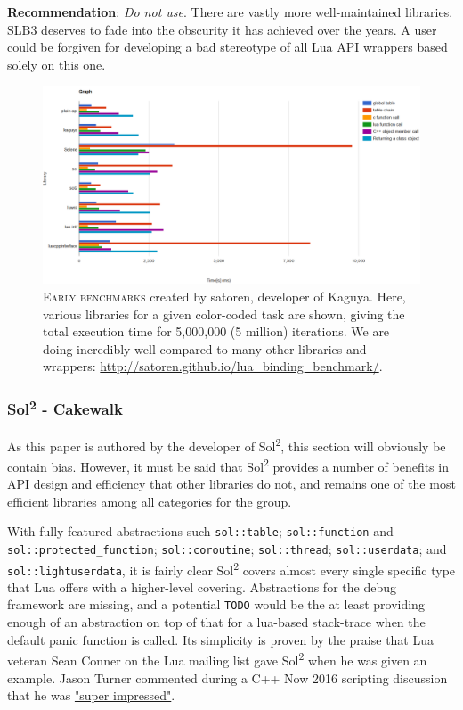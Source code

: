 \documentclass[conference,compsoc]{IEEEtran}
\newcommand{\soltwo}{Sol\textsuperscript{2}}
\begin{document}
\textbf{Recommendation}: \emph{Do not use}. There are vastly more well-maintained libraries. SLB3 deserves to fade into the obscurity it has achieved over the years. A user could be forgiven for developing a bad stereotype of all Lua API wrappers based solely on this one.

\begin{figure}[ht!]
	\includegraphics[width=\textwidth]{early-benchmark}
	\centering
	\caption{\textsc{Early benchmarks} created by satoren, developer of Kaguya. Here, various libraries for a given color-coded task are shown, giving the total execution time for 5,000,000 (5 million) iterations. We are doing incredibly well compared to many other libraries and wrappers: \url{http://satoren.github.io/lua_binding_benchmark/}.}
	\label{fig:early-benchmark}
\end{figure}

\subsubsection{\soltwo{} - Cakewalk}

As this paper is authored by the developer of \soltwo{}, this section will obviously be contain bias. However, it must be said that \soltwo{} provides a number of benefits in API design and efficiency that other libraries do not, and remains one of the most efficient libraries among all categories for the group. 

With fully-featured abstractions such \lstinline|sol::table|; \lstinline|sol::function| and \lstinline|sol::protected_function|; \lstinline|sol::coroutine|; \lstinline|sol::thread|; \lstinline|sol::userdata|; and \lstinline|sol::lightuserdata|, it is fairly clear \soltwo{} covers almost every single specific type that Lua offers with a higher-level covering. Abstractions for the debug framework are missing, and a potential \lstinline|TODO| would be the at least providing enough of an abstraction on top of that for a lua-based stack-trace when the default panic function is called. Its simplicity is proven by the praise that Lua veteran Sean Conner on the Lua mailing list gave \soltwo{} when he was given an example\cite{conman-impressed}. Jason Turner commented during a C++ Now 2016 scripting discussion that he was \href{http://chat.stackoverflow.com/transcript/message/30509197\#30509197}{"super impressed"}.\\
\end{document}

